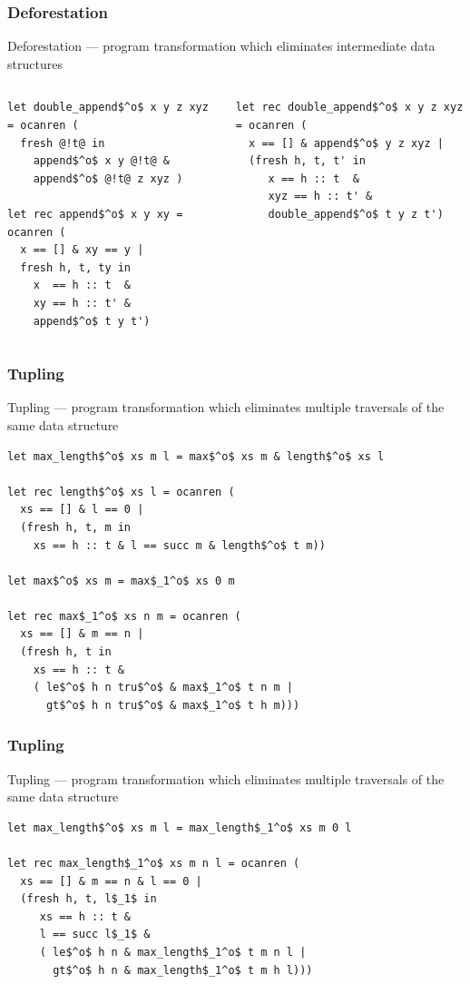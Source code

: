 \documentclass[xcolor=table]{beamer}
\begin{document}
\begin{frame}[fragile]
  \transwipe[direction=90]
  \frametitle{Deforestation}
Deforestation --- program transformation which eliminates intermediate data structures

\begin{columns}
\begin{column}{0.45\textwidth}
\begin{lstlisting}[basicstyle=\footnotesize]
let double_append$^o$ x y z xyz = ocanren (
  fresh @!t@ in
    append$^o$ x y @!t@ &
    append$^o$ @!t@ z xyz )

let rec append$^o$ x y xy = ocanren (
  x == [] & xy == y |
  fresh h, t, ty in
    x  == h :: t  &
    xy == h :: t' &
    append$^o$ t y t')
\end{lstlisting}
\end{column}
\begin{column}{0.55\textwidth}
\begin{lstlisting}[basicstyle=\footnotesize]
let rec double_append$^o$ x y z xyz = ocanren (
  x == [] & append$^o$ y z xyz |
  (fresh h, t, t' in
     x == h :: t  &
     xyz == h :: t' &
     double_append$^o$ t y z t')
\end{lstlisting}
\end{column}
\end{columns}
\end{frame}

\begin{frame}[fragile]
  \transwipe[direction=90]
  \frametitle{Tupling}
Tupling --- program transformation which eliminates multiple traversals of the same data structure

\begin{lstlisting}[basicstyle=\footnotesize]
let max_length$^o$ xs m l = max$^o$ xs m & length$^o$ xs l

let rec length$^o$ xs l = ocanren (
  xs == [] & l == 0 |
  (fresh h, t, m in
    xs == h :: t & l == succ m & length$^o$ t m))

let max$^o$ xs m = max$_1^o$ xs 0 m

let rec max$_1^o$ xs n m = ocanren (
  xs == [] & m == n |
  (fresh h, t in
    xs == h :: t &
    ( le$^o$ h n tru$^o$ & max$_1^o$ t n m |
      gt$^o$ h n tru$^o$ & max$_1^o$ t h m)))
\end{lstlisting}

\end{frame}

\begin{frame}[fragile]
  \transwipe[direction=90]
  \frametitle{Tupling}
Tupling --- program transformation which eliminates multiple traversals of the same data structure

\begin{lstlisting}[basicstyle=\footnotesize]
let max_length$^o$ xs m l = max_length$_1^o$ xs m 0 l

let rec max_length$_1^o$ xs m n l = ocanren (
  xs == [] & m == n & l == 0 |
  (fresh h, t, l$_1$ in
     xs == h :: t &
     l == succ l$_1$ &
     ( le$^o$ h n & max_length$_1^o$ t m n l |
       gt$^o$ h n & max_length$_1^o$ t m h l)))
\end{lstlisting}


\end{frame}
\end{document}
